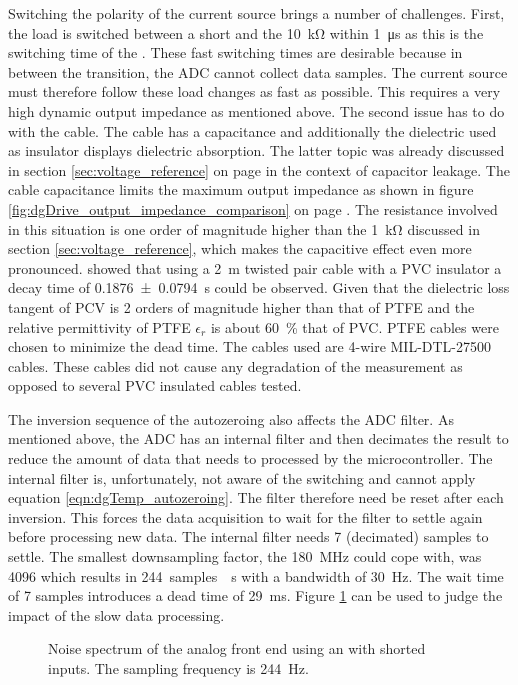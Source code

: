 Switching the polarity of the current source brings a number of challenges. First, the load is switched between a short and the \qty{10}{\kilo\ohm} within \qty{1}{\micro\second} \cite{datasheet_MAX329} as this is the switching time of the . These fast switching times are desirable because in between the transition, the ADC cannot collect data samples. The current source must therefore follow these load changes as fast as possible. This requires a very high dynamic output impedance as mentioned above. The second issue has to do with the cable. The cable has a capacitance and additionally the dielectric used as insulator displays dielectric absorption. The latter topic was already discussed in section \ref{sec:voltage_reference} on page \pageref{sec:dielectric_absorption} in the context of capacitor leakage. The cable capacitance limits the maximum output impedance as shown in figure \ref{fig:dgDrive_output_impedance_comparison} on page \pageref{fig:dgDrive_output_impedance_comparison}. The resistance involved in this situation is one order of magnitude higher than the \qty{1}{\kilo\ohm} discussed in section \ref{sec:voltage_reference}, which makes the capacitive effect even more pronounced. \citeauthor{thesis_sattelmaier} showed that using a \qty{2}{\m} twisted pair cable with a PVC insulator a decay time of \qty{0.1876 \pm 0.0794}{\second} could be observed. Given that the dielectric loss tangent of PCV is \num{2} orders of magnitude higher than that of PTFE \cite{dielectric_absorption_pvc_pe_ptfe} and the relative permittivity of PTFE $\epsilon_r$ is about \qty{60}{\percent} that of PVC. PTFE cables were chosen to minimize the dead time. The cables used are 4-wire MIL-DTL-27500  cables. These cables did not cause any degradation of the measurement as opposed to several PVC insulated cables tested.

The inversion sequence of the autozeroing also affects the ADC filter. As mentioned above, the ADC has an internal filter and then decimates the result to reduce the amount of data that needs to processed by the microcontroller. The internal filter is, unfortunately, not aware of the switching and cannot apply equation \ref{eqn:dgTemp_autozeroing}. The filter therefore need be reset after each inversion. This forces the data acquisition to wait for the filter to settle again before processing new data. The internal filter needs \num{7} (decimated) samples to settle. The smallest downsampling factor, the \qty{180}{\MHz}  could cope with, was \num{4096} which results in \qty{244}{samples \per \second} with a bandwidth of \qty{30}{\Hz}. The wait time of \num{7} samples introduces a dead time of \qty{29}{\ms}. Figure \ref{fig:dgTemp_244sps_shorted_input} can be used to judge the impact of the slow data processing.
\begin{figure}[ht]
    \centering
    \caption{Noise spectrum of the analog front end using an  with shorted inputs. The sampling frequency is \qty{244}{\Hz}.}
    \label{fig:dgTemp_244sps_shorted_input}
\end{figure}

